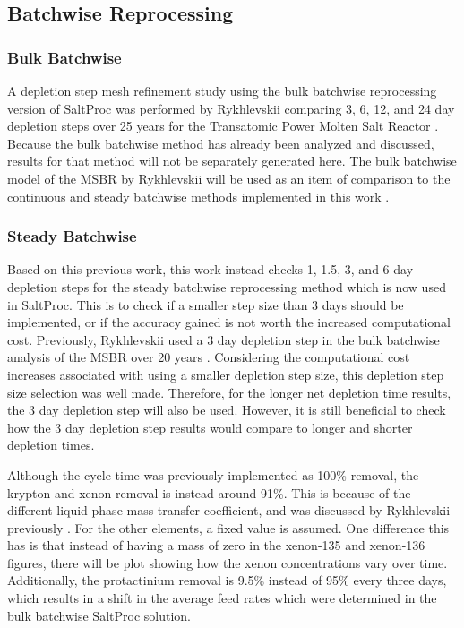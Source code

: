 \subsection{Batchwise Reprocessing}

\subsubsection{Bulk Batchwise}

A depletion step mesh refinement study using the bulk batchwise reprocessing version of SaltProc was performed by Rykhlevskii comparing 3, 6, 12, and 24 day depletion steps over 25 years for the Transatomic Power Molten Salt Reactor \cite{rykhlevskii_fuel_2020}. Because the bulk batchwise method has already been analyzed and discussed, results for that method will not be separately generated here. The bulk batchwise model of the MSBR by Rykhlevskii will be used as an item of comparison to the continuous and steady batchwise methods implemented in this work \cite{rykhlevskii_advanced_2018}.

\subsubsection{Steady Batchwise}

Based on this previous work, this work instead checks 1, 1.5, 3, and 6 day depletion steps for the steady batchwise reprocessing method which is now used in SaltProc. This is to check if a smaller step size than 3 days should be implemented, or if the accuracy gained is not worth the increased computational cost. Previously, Rykhlevskii used a 3 day depletion step in the bulk batchwise analysis of the MSBR over 20 years \cite{rykhlevskii_advanced_2018}. Considering the computational cost increases associated with using a smaller depletion step size, this depletion step size selection was well made. Therefore, for the longer net depletion time results, the 3 day depletion step will also be used. However, it is still beneficial to check how the 3 day depletion step results would compare to longer and shorter depletion times.

Although the cycle time was previously implemented as 100\% removal, the krypton and xenon removal is instead around 91\%. This is because of the different liquid phase mass transfer coefficient, and was discussed by Rykhlevskii previously \cite{rykhlevskii_fuel_2020}. For the other elements, a fixed value is assumed. One difference this has is that instead of having a mass of zero in the xenon-135 and xenon-136 figures, there will be plot showing how the xenon concentrations vary over time. Additionally, the protactinium removal is 9.5\% instead of 95\% every three days, which results in a shift in the average feed rates which were determined in the bulk batchwise SaltProc solution.

